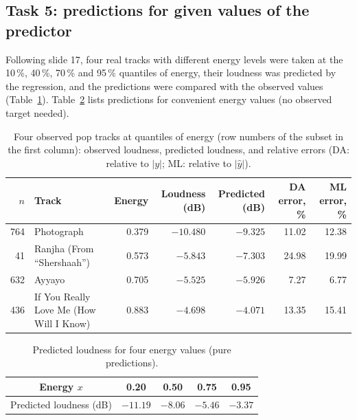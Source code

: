 \documentclass[11pt,letterpaper]{article}
\begin{document}
\subsection{Task 5: predictions for given values of the predictor}\label{sec:a1t5}

Following slide 17, four real tracks with different energy levels were taken
at the 10\,\%, 40\,\%, 70\,\% and 95\,\% quantiles of energy, their loudness
was predicted by the regression, and the predictions were compared with the
observed values (Table~\ref{tab:a1pred}). Table~\ref{tab:a1pure} lists
predictions for convenient energy values (no observed target needed).

\begin{table}[H]
\centering
\caption{Four observed pop tracks at quantiles of energy (row numbers of the
subset in the first column): observed loudness, predicted loudness, and
relative errors (DA: relative to $|y|$; ML: relative to $|\hat y|$).}
\label{tab:a1pred}
\footnotesize
\setlength{\tabcolsep}{5pt}
\begin{tabular}{rlrrrrr}
\toprule
$n$ & Track & Energy & Loudness (dB) & Predicted (dB) & DA error, \% & ML error, \% \\
\midrule
764 & Photograph                    & 0.379 & $-10.480$ & $-9.325$ & 11.02 & 12.38 \\
41  & Ranjha (From ``Shershaah'')   & 0.573 & $-5.843$  & $-7.303$ & 24.98 & 19.99 \\
632 & Ayyayo                        & 0.705 & $-5.525$  & $-5.926$ & 7.27  & 6.77  \\
436 & If You Really Love Me (How Will I Know) & 0.883 & $-4.698$ & $-4.071$ & 13.35 & 15.41 \\
\bottomrule
\end{tabular}
\end{table}

\begin{table}[H]
\centering
\caption{Predicted loudness for four energy values (pure predictions).}
\label{tab:a1pure}
\small
\begin{tabular}{ccccc}
\toprule
Energy $x$ & 0.20 & 0.50 & 0.75 & 0.95 \\
\midrule
Predicted loudness (dB) & $-11.19$ & $-8.06$ & $-5.46$ & $-3.37$ \\
\bottomrule
\end{tabular}
\end{table}
\end{document}
